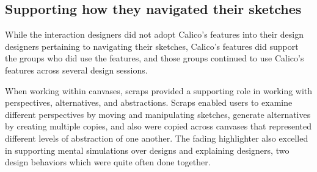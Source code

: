 \documentclass[12pt,fleqn]{ucithesis}
\begin{document}


\subsection{Supporting how they navigated their sketches}

While the interaction designers did not adopt Calico's features into their design designers pertaining to navigating their sketches, Calico's features did support the groups who did use the features, and those groups continued to use Calico's features across several design sessions. 

When working within canvases, scraps provided a supporting role in working with perspectives, alternatives, and abstractions. Scraps enabled users to examine different perspectives by moving and manipulating sketches, generate alternatives by creating multiple copies, and also were copied across canvases that represented different levels of abstraction of one another. The fading highlighter also excelled in supporting mental simulations over designs and explaining designers, two design behaviors which were quite often done together.
\end{document}
